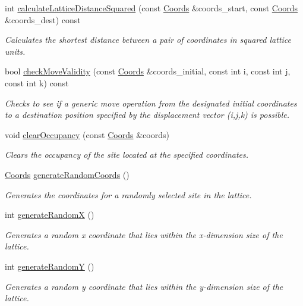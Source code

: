 \begin{DoxyCompactItemize}
int \hyperlink{class_lattice_a3f51b0b41cf0e43e0469320310494a1e}{calculate\+Lattice\+Distance\+Squared} (const \hyperlink{struct_coords}{Coords} \&coords\+\_\+start, const \hyperlink{struct_coords}{Coords} \&coords\+\_\+dest) const
\begin{DoxyCompactList}\small\item\em Calculates the shortest distance between a pair of coordinates in squared lattice units. \end{DoxyCompactList}\item 
bool \hyperlink{class_lattice_ad0592298c4b92e9e84a768b95cd6d0f0}{check\+Move\+Validity} (const \hyperlink{struct_coords}{Coords} \&coords\+\_\+initial, const int i, const int j, const int k) const
\begin{DoxyCompactList}\small\item\em Checks to see if a generic move operation from the designated initial coordinates to a destination position specified by the displacement vector (i,j,k) is possible. \end{DoxyCompactList}\item 
void \hyperlink{class_lattice_a97a1b4f24cd40b81ed63aa2d7713b63b}{clear\+Occupancy} (const \hyperlink{struct_coords}{Coords} \&coords)
\begin{DoxyCompactList}\small\item\em Clears the occupancy of the site located at the specified coordinates. \end{DoxyCompactList}\item 
\hyperlink{struct_coords}{Coords} \hyperlink{class_lattice_a9fbb3c8bc23999ff685b6837beb62606}{generate\+Random\+Coords} ()
\begin{DoxyCompactList}\small\item\em Generates the coordinates for a randomly selected site in the lattice. \end{DoxyCompactList}\item 
int \hyperlink{class_lattice_ab78435e50e3bf9f376c04fc305785bb4}{generate\+RandomX} ()
\begin{DoxyCompactList}\small\item\em Generates a random x coordinate that lies within the x-\/dimension size of the lattice. \end{DoxyCompactList}\item 
int \hyperlink{class_lattice_a180a9d79a40b1a0a092c8ab489569700}{generate\+RandomY} ()
\begin{DoxyCompactList}\small\item\em Generates a random y coordinate that lies within the y-\/dimension size of the lattice. \end{DoxyCompactList}\item 

\end{DoxyCompactItemize}
